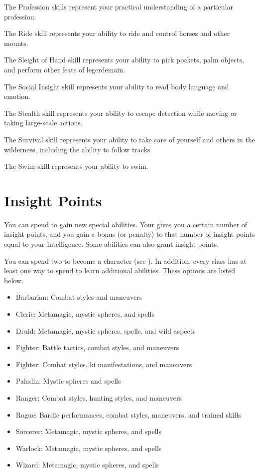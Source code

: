 \begin{raggeditemize}
        \item The Profession skills represent your practical understanding of a particular profession.
        \item The Ride skill represents your ability to ride and control horses and other mounts.
        \item The Sleight of Hand skill represents your ability to pick pockets, palm objects, and perform other feats of legerdemain.
        \item The Social Insight skill represents your ability to read body language and emotion.
        \item The Stealth skill represents your ability to escape detection while moving or taking large-scale actions.
        \item The Survival skill represents your ability to take care of yourself and others in the wilderness, including the ability to follow tracks.
        \item The Swim skill represents your ability to swim.
    \end{raggeditemize}

\section{Insight Points}\label{Insight Points}
    You can spend  to gain new special abilities.
    Your  gives you a certain number of insight points, and you gain a bonus (or penalty) to that number of insight points equal to your Intelligence.
    Some abilities can also grant insight points.
    
    You can spend two  to become a  character (see ).
    In addition, every class has at least one way to spend  to learn additional abilities.
    These options are listed below.
    \begin{itemize}
        \item Barbarian: Combat styles and maneuvers
        \item Cleric: Metamagic, mystic spheres, and spells
        \item Druid: Metamagic, mystic spheres, spells, and wild aspects
        \item Fighter: Battle tactics, combat styles, and maneuvers
        \item Fighter: Combat styles, ki manifestations, and maneuvers
        \item Paladin: Mystic spheres and spells
        \item Ranger: Combat styles, hunting styles, and maneuvers
        \item Rogue: Bardic performances, combat styles, maneuvers, and trained skills
        \item Sorcerer: Metamagic, mystic spheres, and spells
        \item Warlock: Metamagic, mystic spheres, and spells
        \item Wizard: Metamagic, mystic spheres, and spells
    \end{itemize}

